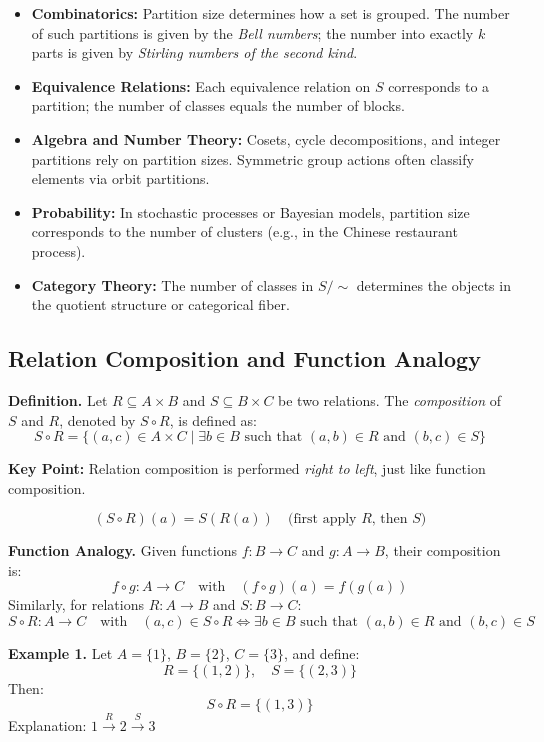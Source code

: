 \documentclass[10pt]{article}
\theoremstyle{plain}
\theoremstyle{definition}
\begin{document}
	\begin{itemize}
		\item \textbf{Combinatorics:} Partition size determines how a set is grouped. The number of such partitions is given by the \emph{Bell numbers}; the number into exactly $k$ parts is given by \emph{Stirling numbers of the second kind}.
		\item \textbf{Equivalence Relations:} Each equivalence relation on $S$ corresponds to a partition; the number of classes equals the number of blocks.
		\item \textbf{Algebra and Number Theory:} Cosets, cycle decompositions, and integer partitions rely on partition sizes. Symmetric group actions often classify elements via orbit partitions.
		\item \textbf{Probability:} In stochastic processes or Bayesian models, partition size corresponds to the number of clusters (e.g., in the Chinese restaurant process).
		\item \textbf{Category Theory:} The number of classes in $S/\!\sim$ determines the objects in the quotient structure or categorical fiber.
	\end{itemize}
	
	\subsection*{Relation Composition and Function Analogy}
	
	\textbf{Definition.}  
	Let $R \subseteq A \times B$ and $S \subseteq B \times C$ be two relations.  
	The \emph{composition} of $S$ and $R$, denoted by $S \circ R$, is defined as:
	\[
	S \circ R = \{ (a, c) \in A \times C \mid \exists b \in B \text{ such that } (a, b) \in R \text{ and } (b, c) \in S \}
	\]
	
	\textbf{Key Point:} Relation composition is performed \emph{right to left}, just like function composition.
	
	\[
	(S \circ R)(a) = S(R(a)) \quad \text{(first apply $R$, then $S$)}
	\]
	
	\textbf{Function Analogy.}  
	Given functions $f: B \to C$ and $g: A \to B$, their composition is:
	\[
	f \circ g : A \to C \quad \text{with} \quad (f \circ g)(a) = f(g(a))
	\]
	Similarly, for relations $R: A \to B$ and $S: B \to C$:
	\[
	S \circ R : A \to C \quad \text{with} \quad (a, c) \in S \circ R \iff \exists b \in B \text{ such that } (a, b) \in R \text{ and } (b, c) \in S
	\]
	
	\textbf{Example 1.}  
	Let $A = \{1\}$, $B = \{2\}$, $C = \{3\}$,  
	and define:
	\[
	R = \{(1, 2)\}, \quad S = \{(2, 3)\}
	\]
	Then:
	\[
	S \circ R = \{(1, 3)\}
	\]
	Explanation: $1 \xrightarrow{R} 2 \xrightarrow{S} 3$
	
\end{document}
